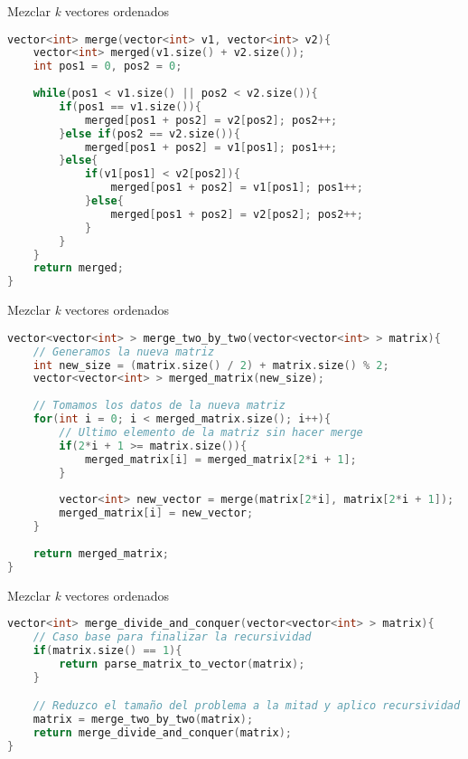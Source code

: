 \documentclass[10pt, xcolor=table]{beamer}
\begin{document}
\begin{frame}[fragile]{Mezclar \textit{k} vectores ordenados}
\begin{lstlisting}[language=C]
vector<int> merge(vector<int> v1, vector<int> v2){
	vector<int> merged(v1.size() + v2.size());
	int pos1 = 0, pos2 = 0;
	
	while(pos1 < v1.size() || pos2 < v2.size()){
		if(pos1 == v1.size()){
			merged[pos1 + pos2] = v2[pos2]; pos2++;
		}else if(pos2 == v2.size()){
			merged[pos1 + pos2] = v1[pos1];	pos1++;
		}else{
			if(v1[pos1] < v2[pos2]){
				merged[pos1 + pos2] = v1[pos1]; pos1++;
			}else{
				merged[pos1 + pos2] = v2[pos2]; pos2++;
			}
		}
	}
	return merged;
}

\end{lstlisting}
\end{frame}
\begin{frame}[fragile]{Mezclar \textit{k} vectores ordenados}
\begin{lstlisting}[language=C]
vector<vector<int> > merge_two_by_two(vector<vector<int> > matrix){
	// Generamos la nueva matriz
	int new_size = (matrix.size() / 2) + matrix.size() % 2;
	vector<vector<int> > merged_matrix(new_size);
	
	// Tomamos los datos de la nueva matriz
	for(int i = 0; i < merged_matrix.size(); i++){
		// Ultimo elemento de la matriz sin hacer merge
		if(2*i + 1 >= matrix.size()){
			merged_matrix[i] = merged_matrix[2*i + 1];
		}
	
		vector<int> new_vector = merge(matrix[2*i], matrix[2*i + 1]);
		merged_matrix[i] = new_vector;
	}
	
	return merged_matrix;
}


\end{lstlisting}
\end{frame}

\begin{frame}[fragile]{Mezclar \textit{k} vectores ordenados}
\begin{lstlisting}[language=C]
vector<int> merge_divide_and_conquer(vector<vector<int> > matrix){
	// Caso base para finalizar la recursividad
	if(matrix.size() == 1){
		return parse_matrix_to_vector(matrix);
	}

	// Reduzco el tamaño del problema a la mitad y aplico recursividad
	matrix = merge_two_by_two(matrix);
	return merge_divide_and_conquer(matrix);
}

\end{lstlisting}
\end{frame}
\end{document}
